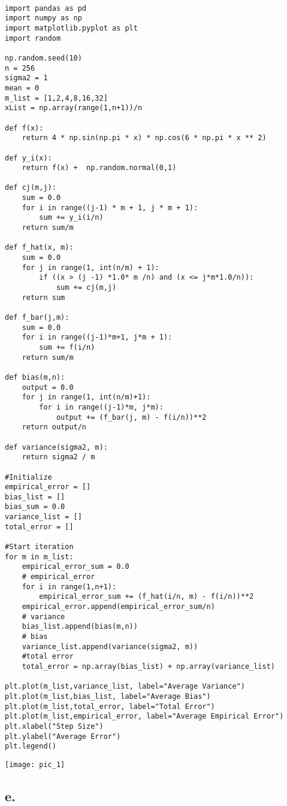 \documentclass{article}
\begin{document}
	
\begin{verbatim}

import pandas as pd
import numpy as np
import matplotlib.pyplot as plt
import random

np.random.seed(10)
n = 256
sigma2 = 1
mean = 0
m_list = [1,2,4,8,16,32]
xList = np.array(range(1,n+1))/n

def f(x):
	return 4 * np.sin(np.pi * x) * np.cos(6 * np.pi * x ** 2)

def y_i(x):
	return f(x) +  np.random.normal(0,1) 

def cj(m,j):
	sum = 0.0
	for i in range((j-1) * m + 1, j * m + 1):
		sum += y_i(i/n)
	return sum/m

def f_hat(x, m):
	sum = 0.0
	for j in range(1, int(n/m) + 1):
		if ((x > (j -1) *1.0* m /n) and (x <= j*m*1.0/n)):
			sum += cj(m,j)
	return sum

def f_bar(j,m):
	sum = 0.0
	for i in range((j-1)*m+1, j*m + 1):
		sum += f(i/n)
	return sum/m

def bias(m,n):
	output = 0.0
	for j in range(1, int(n/m)+1):
		for i in range((j-1)*m, j*m):
			output += (f_bar(j, m) - f(i/n))**2
	return output/n

def variance(sigma2, m):
	return sigma2 / m

#Initialize 
empirical_error = []
bias_list = []
bias_sum = 0.0
variance_list = []
total_error = []

#Start iteration
for m in m_list:
	empirical_error_sum = 0.0
	# empirical_error
	for i in range(1,n+1):
		empirical_error_sum += (f_hat(i/n, m) - f(i/n))**2
	empirical_error.append(empirical_error_sum/n)
	# variance
	bias_list.append(bias(m,n))
	# bias
	variance_list.append(variance(sigma2, m))
	#total error
	total_error = np.array(bias_list) + np.array(variance_list)

plt.plot(m_list,variance_list, label="Average Variance")
plt.plot(m_list,bias_list, label="Average Bias")
plt.plot(m_list,total_error, label="Total Error")
plt.plot(m_list,empirical_error, label="Average Empirical Error")
plt.xlabel("Step Size")
plt.ylabel("Average Error")
plt.legend()
\end{verbatim}
	
\texttt{[image: pic\_1]}

\subsection*{e.}
\end{document}
